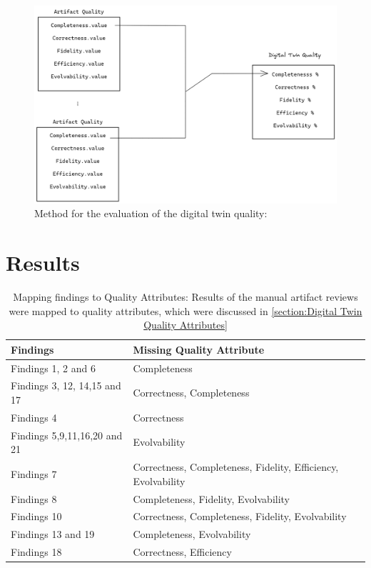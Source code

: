\documentclass{llncs}
\begin{document}
    \begin{figure}[htbp]
        \includegraphics[scale = 0.35]{DigitalTwinQuality.png}
            \caption{Method for the evaluation of the digital twin quality:}
        \label{fig:MethodforDigitalTwinQuality}
    \end{figure}
   
    
    \section{Results}

    \begin{table}[h!]
        \begin{center}
          \caption{Mapping findings to Quality Attributes: Results of the manual artifact reviews were mapped to quality attributes, which were discussed in \ref{section:Digital Twin Quality Attributes}}
          \label{tab:Mapping}
          \begin{tabular}{l@{\hspace{1cm}}l} 
            \textbf{Findings} & \textbf{Missing Quality Attribute}\\
            \hline
            Findings 1, 2 and 6 &     Completeness\\
            Findings 3, 12, 14,15 and 17  &     Correctness, Completeness\\
            Findings 4 &     Correctness\\
            Findings 5,9,11,16,20 and 21 &     Evolvability\\
            Findings 7 &     Correctness, Completeness, Fidelity, Efficiency, Evolvability\\
            Findings 8 &     Completeness, Fidelity, Evolvability\\
            Findings 10 &    Correctness, Completeness, Fidelity, Evolvability\\
            Findings 13 and 19 &    Completeness, Evolvability\\
            Findings 18&Correctness, Efficiency \\
    \end{tabular}
    \end{center}
    \end{table}
\end{document}
